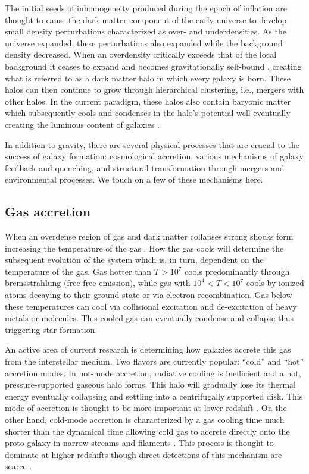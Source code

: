 The initial seeds of inhomogeneity produced during the epoch of inflation are thought to cause the dark matter component of the early universe to develop small density perturbations characterized as over- and underdensities. As the universe expanded, these perturbations also expanded while the background density decreased. When an overdensity critically exceeds that of the local background it ceases to expand and becomes gravitationally self-bound \citep{Gunn1972}, creating what is referred to as a dark matter halo in which every galaxy is born. These halos can then continue to grow through hierarchical clustering, i.e., mergers with other halos. In the current paradigm, these halos also contain baryonic matter which subsequently cools and condenses in the halo's potential well eventually creating the luminous content of galaxies \citep{White1978}. 

In addition to gravity, there are several physical processes that are crucial to the success of galaxy formation: cosmological accretion, various mechanisms of galaxy feedback and quenching, and structural transformation through mergers and environmental processes. We touch on a few of these mechanisms here. 


\subsection{Gas accretion}

When an overdense region of gas and dark matter collapses strong shocks form increasing the temperature of the gas \citep{Binney1977,Rees1977}. How the gas cools will determine the subsequent evolution of the system which is, in turn, dependent on the temperature of the gas.  Gas hotter than $T>10^7$ cools predominantly through bremsstrahlung (free-free emission), while gas with $10^4<T<10^7$ cools by ionized atoms decaying to their ground state or via electron recombination. Gas below these temperatures can cool via collisional excitation and de-excitation of heavy metals or molecules. This cooled gas can eventually condense and collapse thus triggering star formation. 

An active area of current research is determining how galaxies accrete this gas from the interstellar medium. Two flavors are currently popular: ``cold'' and ``hot'' accretion modes. In hot-mode accretion, radiative cooling is inefficient and a hot, pressure-supported gaseous halo forms. This halo will gradually lose its thermal energy eventually collapsing and settling into a centrifugally supported disk.  This mode of accretion is thought to be more important at lower redshift \cite{Faucher-Giguere2011,VandeVoort2011}. On the other hand, cold-mode accretion is characterized by a gas cooling time much shorter than the dynamical time allowing cold gas to accrete directly onto the proto-galaxy in narrow streams and filaments \citep{WhiteFrenk1991, Birnboim2003,Keres2005,Dekel2009b}. This process is thought to dominate at higher redshifts \citep{Katz2003} though direct detections of this mechanism are scarce \citep{Steidel2010,Beck2016,Fumagalli2016,Martin2015,Martin2016}.


